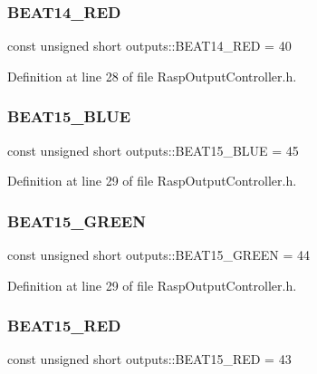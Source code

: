 \subsubsection{\texorpdfstring{B\+E\+A\+T14\+\_\+\+R\+ED}{BEAT14\_RED}}
{\footnotesize\ttfamily const unsigned short outputs\+::\+B\+E\+A\+T14\+\_\+\+R\+ED = 40}



Definition at line 28 of file Rasp\+Output\+Controller.\+h.

\mbox{\label{namespaceoutputs_a6d12c95904da18827ed262896b9ebaa1}} 
\subsubsection{\texorpdfstring{B\+E\+A\+T15\+\_\+\+B\+L\+UE}{BEAT15\_BLUE}}
{\footnotesize\ttfamily const unsigned short outputs\+::\+B\+E\+A\+T15\+\_\+\+B\+L\+UE = 45}



Definition at line 29 of file Rasp\+Output\+Controller.\+h.

\mbox{\label{namespaceoutputs_afacd3fd74ab006d3ce548b672c3ab2f7}} 
\subsubsection{\texorpdfstring{B\+E\+A\+T15\+\_\+\+G\+R\+E\+EN}{BEAT15\_GREEN}}
{\footnotesize\ttfamily const unsigned short outputs\+::\+B\+E\+A\+T15\+\_\+\+G\+R\+E\+EN = 44}



Definition at line 29 of file Rasp\+Output\+Controller.\+h.

\mbox{\label{namespaceoutputs_a6cdbcf8d70f85316af1ea2b96d9b72bd}} 
\subsubsection{\texorpdfstring{B\+E\+A\+T15\+\_\+\+R\+ED}{BEAT15\_RED}}
{\footnotesize\ttfamily const unsigned short outputs\+::\+B\+E\+A\+T15\+\_\+\+R\+ED = 43}



